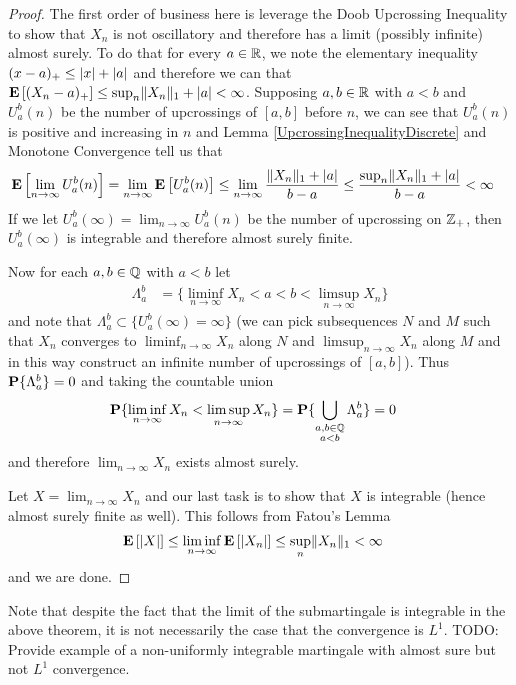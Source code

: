 \begin{proof}
The first order of business here is leverage the Doob Upcrossing
Inequality to show that $X_n$ is not oscillatory and therefore has a limit (possibly infinite) almost
surely.  To do that for every $a \in \mathbb{R}$, we note the elementary inequality $(x - a)_+ \leq
\left \vert x \right \vert + \left \vert a \right \vert$ and therefore we can that $\textbf{E}\left[(X_n -
  a)_+\right] \leq \sup_n \lVert X_n \rVert_1 + \left \vert a \right \vert< \infty$.
Supposing $a,b \in \mathbb{R}$ with $a<b$ and $U_a^b(n)$ be the number of upcrossings of $[a,b]$ before $n$,
we can see that $U_a^b(n)$ is positive and increasing in $n$ and Lemma
\ref{UpcrossingInequalityDiscrete} and Monotone Convergence tell us
that 
\begin{align*}
\textbf{E}\left[\lim_{n \to \infty} U_a^b(n)\right] &= \lim_{n \to \infty}
\textbf{E}\left[U_a^b(n)\right] \leq 
\lim_{n \to \infty} \frac{\lVert X_n \rVert_1 + \left \vert a \right \vert}{b-a} \leq 
\frac{\sup_n \lVert X_n \rVert_1 + \left \vert a \right \vert}{b-a} < \infty
\end{align*}
If we let $U_a^b(\infty) = \lim_{n \to \infty} U_a^b(n)$ be the number
of upcrossing on $\mathbb{Z}_+$, then
$U_a^b(\infty)$ is integrable and therefore almost
surely finite.

Now for each $a,b \in \mathbb{Q}$ with $a<b$ let 
\begin{align*}
\Lambda_a^b &=
\lbrace \liminf_{n \to \infty} X_n < a < b < \limsup_{n \to
  \infty} X_n \rbrace
\end{align*}
and note that $\Lambda_a^b \subset \lbrace U_a^b(\infty)
= \infty \rbrace$ (we can pick subsequences $N$ and $M$ such that
$X_n$ converges to $\liminf_{n \to \infty} X_n$ along $N$ and 
$\limsup_{n \to  \infty} X_n$ along $M$ and in this way construct an
infinite number of upcrossings of $[a,b]$).  Thus
$\textbf{P}\{\Lambda_a^b\} = 0$ and taking the countable union
\begin{align*}
\textbf{P}\{\liminf_{n \to \infty} X_n < \limsup_{n \to  \infty} X_n\}
&= \textbf{P}\{\bigcup_{
\substack{
a,b \in \mathbb{Q} \\
a<b
}} \Lambda_a^b\} = 0
\end{align*}
and therefore $\lim_{n \to \infty} X_n$ exists almost surely.

Let $X = \lim_{n \to \infty} X_n$ and our last task is to show that
$X$ is integrable (hence almost surely finite as well).  This follows
from Fatou's Lemma
\begin{align*}
\textbf{E}\left[\left \vert X \right \vert\right] &\leq \liminf_{n \to \infty}
\textbf{E}\left[\left \vert X_n  \right \vert\right] \leq \sup_n \lVert X_n \rVert_1 < \infty
\end{align*}
and we are done.
\end{proof} 
Note that despite the fact that the limit of the submartingale is
integrable in the above theorem, it is not necessarily the case that the
convergence is $L^1$.
TODO: Provide example of a non-uniformly integrable martingale with
almost sure but not $L^1$ convergence.



